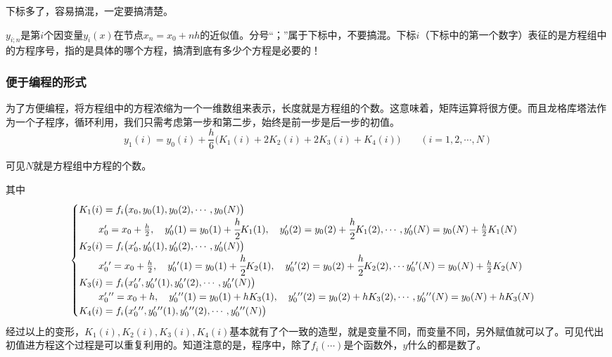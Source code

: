 下标多了，容易搞混，一定要搞清楚。

$y_{i;n}$是第$i$个因变量$y_i(x)$在节点$x_n=x_0+nh$的近似值。分号“；”属于下标中，不要搞混。下标$i$（下标中的第一个数字）表征的是方程组中的方程序号，指的是具体的哪个方程，搞清到底有多少个方程是必要的！



\subsubsection{便于编程的形式}
为了方便编程，将方程组中的方程浓缩为一个一维数组来表示，长度就是方程组的个数。这意味着，矩阵运算将很方便。而且龙格库塔法作为一个子程序，循环利用，我们只需考虑第一步和第二步，始终是前一步是后一步的初值。
$$y_{1}(i)=y_{0}(i)+\frac{h}{6}\Big(K_{1}(i)+2K_{2}(i)+2K_{3}(i)+K_{4}(i)\Big) \qquad (i=1,2,\cdots,N)$$

可见$N$就是方程组中方程的个数。

其中
$$\begin{cases}
K_{1}(i)=f_i\big(x_0,y_{0}(1),y_{0}(2),\cdots,y_{0}(N)\big)\\
\qquad x_0\rq{}=x_0+\frac{h}{2} ,\quad y_{0}\rq{}(1)= y_{0}(1)+\cfrac{h}{2}K_{1}(1),
\quad   y_{0}\rq{}(2)=y_{0}(2)+\cfrac{h}{2}K_{1}(2), \cdots,y_{0}\rq{}(N)=y_{0}(N)+\frac{h}{2}K_{1}(N)\\
K_{2}(i)=f_i\big(x_0\rq{},y_{0}\rq{}(1),y_{0}\rq{}(2),\cdots,y_{0}\rq{}(N)\big)\\
\qquad x_0\rq{}\rq{}=x_0+\frac{h}{2} ,\quad y_{0}\rq{}\rq{}(1)= y_{0}(1)+\cfrac{h}{2}K_{2}(1),
\quad   y_{0}\rq{}\rq{}(2)=y_{0}(2)+\cfrac{h}{2}K_{2}(2),\cdots y_{0}\rq{}\rq{}(N)=y_{0}(N)+\frac{h}{2}K_{2}(N)\\
K_{3}(i)=f_i\big(x_0\rq{}\rq{},y_{0}\rq{}\rq{}(1),y_{0}\rq{}\rq{}(2),\cdots,y_{0}\rq{}\rq{}(N)\big)\\
\qquad x_0\rq{}\rq{}\rq{}=x_0+h ,\quad y_{0}\rq{}\rq{}\rq{}(1)= y_{0}(1)+hK_{3}(1),
\quad   y_{0}\rq{}\rq{}\rq{}(2)=y_{0}(2)+hK_{3}(2),\cdots, y_{0}\rq{}\rq{}\rq{}(N)=y_{0}(N)+hK_{3}(N)\\
K_{4}(i)=f_i\big(x_0\rq{}\rq{}\rq{},y_{0}\rq{}\rq{}\rq{}(1),y_{0}\rq{}\rq{}\rq{}(2),\cdots,y_{0}\rq{}\rq{}\rq{}(N)\big)\\
\end{cases}
$$
经过以上的变形，$K_1(i),K_2(i),K_3(i),K_4(i)$基本就有了个一致的造型，就是变量不同，而变量不同，另外赋值就可以了。可见代出初值进方程这个过程是可以重复利用的。知道注意的是，程序中，除了$f_i(\cdots)$是个函数外，$y$什么的都是数了。

